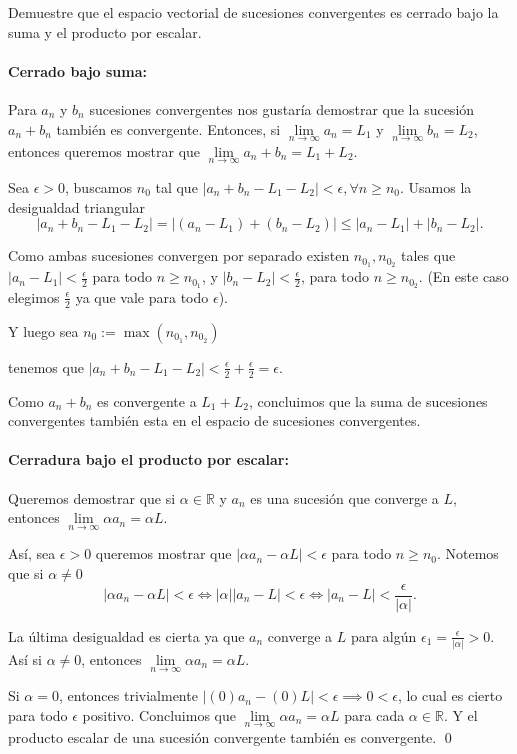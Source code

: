 \documentclass[12pt]{book}
\begin{document}
\begin{exampleenv}
Demuestre que el espacio vectorial de sucesiones convergentes es cerrado bajo la suma y el producto por escalar. 

\paragraph{Cerrado bajo suma:}

Para $a_n$ y $b_n$ sucesiones convergentes nos gustaría demostrar que la sucesión $a_n+b_n$ también es convergente. Entonces, si $\lim\limits_{n\to\infty}a_n=L_1$ y $\lim\limits_{n\to\infty}b_n=L_2$, entonces queremos mostrar que $\lim\limits_{n\to\infty}a_n+b_n=L_1+L_2$.

Sea $\epsilon>0$, buscamos $n_0$ tal que $|a_n+b_n-L_1-L_2|<\epsilon, \forall n\ge n_0$. Usamos la desigualdad triangular
\[
    |a_n+b_n-L_1-L_2|=|(a_n-L_1)+(b_n-L_2)|\leq |a_n-L_1|+|b_n-L_2|.
\]

Como ambas sucesiones convergen por separado existen $n_{0_1}, n_{0_2}$ tales que $|a_{n}-L_1|<\frac{\epsilon}{2}$ para todo $n\ge n_{0_1}$, y $|b_{n}-L_2|<\frac{\epsilon}{2}$, para todo $n\ge n_{0_2}$. (En este caso elegimos $\frac{\epsilon}{2}$ ya que vale para todo $\epsilon$).

Y luego sea $n_0:=\max(n_{0_1},n_{0_2})$

tenemos que $|a_n+b_n-L_1-L_2|<\frac{\epsilon}{2}+\frac{\epsilon}{2}=\epsilon$.

Como $a_n+b_n$ es convergente a $L_1+L_2$, concluimos que la suma de sucesiones convergentes también esta en el espacio de sucesiones convergentes.

\paragraph{Cerradura bajo el producto por escalar:}
Queremos demostrar que si $\alpha\in \mathbb{R}$ y $a_n$ es una sucesión que converge a $L$, entonces $\lim\limits_{n\to\infty}\alpha a_n=\alpha L$.

Así, sea $\epsilon>0$ queremos mostrar que $|\alpha a_n-\alpha L|<\epsilon$ para todo $n\ge n_0$. Notemos que si $\alpha \neq0$
\[
    |\alpha a_n-\alpha L|<\epsilon\iff |\alpha||a_n-L|<\epsilon \iff |a_n-L|<\frac{\epsilon}{|\alpha|}.
\]

La última desigualdad es cierta ya que $a_n$ converge a $L$ para algún $\epsilon_1=\frac{\epsilon}{|\alpha|}>0$. Así si $\alpha\neq0$, entonces $\lim\limits_{n\to\infty} \alpha a_n=\alpha L$.

Si $\alpha=0$, entonces trivialmente $|(0)a_n-(0)L|<\epsilon \implies 0<\epsilon$, lo cual es cierto para todo $\epsilon$ positivo. Concluimos que $\lim\limits_{n\to\infty} \alpha a_n=\alpha L$ para cada $\alpha \in \mathbb{R}$. Y el producto escalar de una sucesión convergente también es convergente. \qed
\end{exampleenv}
\end{document}
